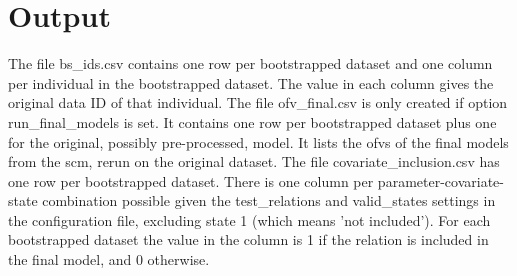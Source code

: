 \section{Output}

The file bs\_ids.csv contains one row per bootstrapped dataset and one column per individual in the bootstrapped dataset. The value in each column gives the original data ID of that individual.
The file ofv\_final.csv is only created if option run\_final\_models is set. It contains one row per bootstrapped dataset plus one for the original, possibly pre-processed, model. It lists the ofvs of the final models from the scm, rerun on the original dataset.
The file covariate\_inclusion.csv has one row per bootstrapped dataset. There is one column per parameter-covariate-state combination possible given the test\_relations and valid\_states settings in the configuration file, excluding state 1 (which means 'not included'). For each bootstrapped dataset the value in the column is 1 if the relation is included in the final model, and 0 otherwise.


